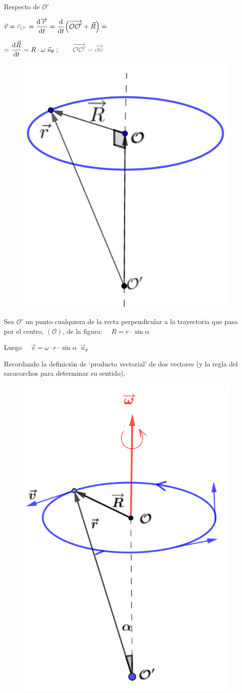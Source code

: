 \begin{multicols}{2}
Respecto de $\mathcal O'$

$\displaystyle \vec v = \textcolor{gris}{\vec v_{\mathcal O'}}=\dv{\overrightarrow{ r }}{t} = \dv{t}(\overrightarrow{\mathcal O \mathcal O'}+\vec R )=$

$\displaystyle =\dv {\vec R} {t}=R\cdot \omega\; \vec u_\theta\; ; \qquad \textcolor{gris}{\overrightarrow{\mathcal O \mathcal O'}=\overrightarrow{cte}}$

\begin{figure}[H]
		\centering
		\includegraphics[width=.25\textwidth]{imagenes/imagenes02/T02IM07.png}
		\end{figure}
\end{multicols}

\begin{multicols}{2}
Sea $\mathcal O'$ un punto cualquiera de la recta perpendicular a la trayectoria que pasa por el centro, $(\mathcal O)$, de la figura:
$\quad R=r\cdot \sin \alpha$

Luego $\quad \vec v= \omega \cdot r \cdot \sin \alpha \;\; \vec u_\theta$

Recordando la definición de `producto vectorial' de dos vectores (y la regla del sacacorchos para determinar su sentido),

\begin{figure}[H]
		\centering
		\includegraphics[width=.3\textwidth]{imagenes/imagenes02/T02IM08.png}
		\end{figure}
\end{multicols}

